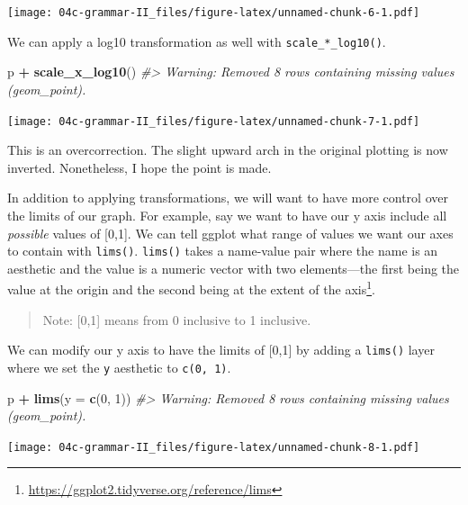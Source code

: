 \documentclass[
]{book}
\newenvironment{Shaded}{\begin{snugshade}}{\end{snugshade}}
\newcommand{\CommentTok}[1]{\textcolor[rgb]{0.56,0.35,0.01}{\textit{#1}}}
\newcommand{\DataTypeTok}[1]{\textcolor[rgb]{0.13,0.29,0.53}{#1}}
\newcommand{\DecValTok}[1]{\textcolor[rgb]{0.00,0.00,0.81}{#1}}
\newcommand{\KeywordTok}[1]{\textcolor[rgb]{0.13,0.29,0.53}{\textbf{#1}}}
\newcommand{\NormalTok}[1]{#1}
\newcommand{\OperatorTok}[1]{\textcolor[rgb]{0.81,0.36,0.00}{\textbf{#1}}}
\newcommand{\StringTok}[1]{\textcolor[rgb]{0.31,0.60,0.02}{#1}}
\begin{document}
\texttt{[image: 04c-grammar-II\_files/figure-latex/unnamed-chunk-6-1.pdf]}

We can apply a log10 transformation as well with \texttt{scale\_*\_log10()}.

\begin{Shaded}
\begin{Highlighting}[]
\NormalTok{p }\OperatorTok{+}
\StringTok{  }\KeywordTok{scale\_x\_log10}\NormalTok{() }
\CommentTok{\#\textgreater{} Warning: Removed 8 rows containing missing values (geom\_point).}
\end{Highlighting}
\end{Shaded}

\texttt{[image: 04c-grammar-II\_files/figure-latex/unnamed-chunk-7-1.pdf]}

This is an overcorrection. The slight upward arch in the original plotting is now inverted. Nonetheless, I hope the point is made.

In addition to applying transformations, we will want to have more control over the limits of our graph. For example, say we want to have our y axis include all \emph{possible} values of {[}0,1{]}. We can tell ggplot what range of values we want our axes to contain with \texttt{lims()}. \texttt{lims()} takes a name-value pair where the name is an aesthetic and the value is a numeric vector with two elements---the first being the value at the origin and the second being at the extent of the axis\footnote{\url{https://ggplot2.tidyverse.org/reference/lims}}.

\begin{quote}
Note: {[}0,1{]} means from 0 inclusive to 1 inclusive.
\end{quote}

We can modify our y axis to have the limits of {[}0,1{]} by adding a \texttt{lims()} layer where we set the \texttt{y} aesthetic to \texttt{c(0,\ 1)}.

\begin{Shaded}
\begin{Highlighting}[]
\NormalTok{p }\OperatorTok{+}
\StringTok{  }\KeywordTok{lims}\NormalTok{(}\DataTypeTok{y =} \KeywordTok{c}\NormalTok{(}\DecValTok{0}\NormalTok{, }\DecValTok{1}\NormalTok{))}
\CommentTok{\#\textgreater{} Warning: Removed 8 rows containing missing values (geom\_point).}
\end{Highlighting}
\end{Shaded}

\texttt{[image: 04c-grammar-II\_files/figure-latex/unnamed-chunk-8-1.pdf]}
\end{document}
